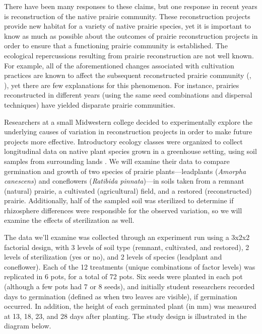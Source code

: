\documentclass[
]{krantz}
\begin{document}
There have been many responses to these claims, but one response in recent years is reconstruction of the native prairie community. These reconstruction projects provide new habitat for a variety of native prairie species, yet it is important to know as much as possible about the outcomes of prairie reconstruction projects in order to ensure that a functioning prairie community is established. The ecological repercussions resulting from prairie reconstruction are not well known. For example, all of the aforementioned changes associated with cultivation practices are known to affect the subsequent reconstructed prairie community (\citet{Baer2002}, \citet{Camill2004}), yet there are few explanations for this phenomenon. For instance, prairies reconstructed in different years (using the same seed combinations and dispersal techniques) have yielded disparate prairie communities.

Researchers at a small Midwestern college decided to experimentally explore the underlying causes of variation in reconstruction projects in order to make future projects more effective. Introductory ecology classes were organized to collect longitudinal data on native plant species grown in a greenhouse setting, using soil samples from surrounding lands \citep{Angell2010}. We will examine their data to compare germination and growth of two species of prairie plants---leadplants (\emph{Amorpha canescens}) and coneflowers (\emph{Ratibida pinnata})---in soils taken from a remnant (natural) prairie, a cultivated (agricultural) field, and a restored (reconstructed) prairie. Additionally, half of the sampled soil was sterilized to determine if rhizosphere differences were responsible for the observed variation, so we will examine the effects of sterilization as well.

The data we'll examine was collected through an experiment run using a 3x2x2 factorial design, with 3 levels of soil type (remnant, cultivated, and restored), 2 levels of sterilization (yes or no), and 2 levels of species (leadplant and coneflower). Each of the 12 treatments (unique combinations of factor levels) was replicated in 6 pots, for a total of 72 pots. Six seeds were planted in each pot (although a few pots had 7 or 8 seeds), and initially student researchers recorded days to germination (defined as when two leaves are visible), if germination occurred. In addition, the height of each germinated plant (in mm) was measured at 13, 18, 23, and 28 days after planting. The study design is illustrated in the diagram below.
\end{document}
